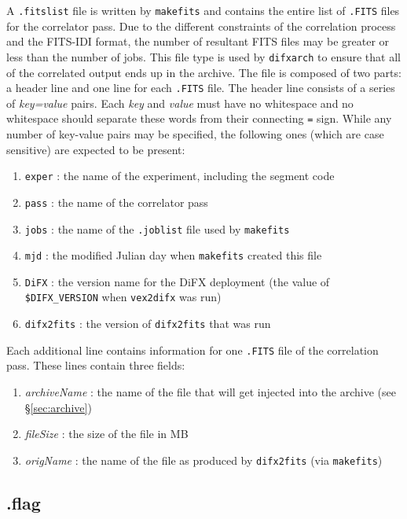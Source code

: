 A {\tt .fitslist} file is written by {\tt makefits} and contains the entire list of {\tt .FITS} files for the correlator pass.
Due to the different constraints of the correlation process and the FITS-IDI format, the number of resultant FITS files may be greater or less than the number of jobs.
This file type is used by {\tt difxarch} to ensure that all of the correlated output ends up in the archive.
The file is composed of two parts: a header line and one line for each {\tt .FITS} file.
The header line consists of a series of {\em key=value} pairs.  
Each {\em key} and {\em value} must have no whitespace and no whitespace should separate these words from their connecting {\tt =} sign.
While any number of key-value pairs may be specified, the following ones (which are case sensitive) are expected to be present:
\begin{enumerate}
\item {\tt exper} : the name of the experiment, including the segment code
\item {\tt pass} : the name of the correlator pass
\item {\tt jobs} : the name of the {\tt .joblist} file used by {\tt makefits}
\item {\tt mjd} : the modified Julian day when {\tt makefits} created this file
\item {\tt DiFX} : the version name for the DiFX deployment (the value of {\tt \$DIFX\_VERSION} when {\tt vex2difx} was run)
\item {\tt difx2fits} : the version of {\tt difx2fits} that was run
\end{enumerate}
Each additional line contains information for one {\tt .FITS} file of the correlation pass.
These lines contain three fields:
\begin{enumerate}
\item {\em archiveName} : the name of the file that will get injected into the archive (see \S\ref{sec:archive})
\item {\em fileSize} : the size of the file in MB
\item {\em origName} : the name of the file as produced by {\tt difx2fits} (via {\tt makefits})
\end{enumerate}








\subsection{.flag} \label{sec:dotflag}

